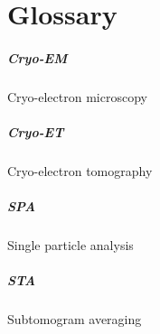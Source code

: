 \chapter{Glossary}

\paragraph{Cryo-EM} Cryo-electron microscopy

\paragraph{Cryo-ET} Cryo-electron tomography

\paragraph{SPA} Single particle analysis

\paragraph{STA} Subtomogram averaging

